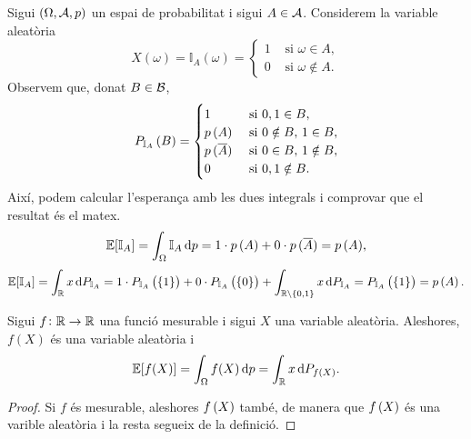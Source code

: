 \begin{example}
    Sigui $\left( \Omega, \mathcal{A}, p\right)$ un espai de probabilitat i sigui $A\in\mathcal{A}$. Considerem la variable aleatòria
    \[
        X(\omega) = \mathbb{I}_A(\omega) = \begin{cases}
        1&\text{ si } \omega\in A, \\ 0&\text{ si } \omega \notin A.
        \end{cases}
    \]
    Observem que, donat $B\in\mathcal{B}$,
    \[
        P_{\mathbb{I}_A}\left( B\right) = \begin{cases}
            1 &\text{ si } 0,1\in B,\\
            p\left( A\right) &\text{ si } 0\notin B,\, 1\in B,\\
            p\,( \overline{A}) &\text{ si } 0\in B,\, 1\notin B,\\
            0 & \text{ si } 0,1\notin B.
        \end{cases}
    \]
    Així, podem calcular l'esperança amb les dues integrals i comprovar que el resultat és el matex.
    \[
        \esp[\mathbb{I}_A] = \int_\Omega{\mathbb{I}_A \dif p} = 1\cdot p\,(A) + 0\cdot p\,(\comp{A}) = p\,(A),
    \]
    \[
        \esp[\mathbb{I}_A] = \int_\real{x\dif P_{\mathbb{I}_A}} = 1\cdot P_{\mathbb{I}_A}\lp\lc 1\rc\rp + 0\cdot P_{\mathbb{I}_A}\lp\lc 0\rc\rp+ \int_{\real\setminus\lc 0,1\rc} x\dif P_{\mathbb{I}_A} = P_{\mathbb{I}_A}\lp\lc 1\rc\rp = p\lp A\rp.
    \]
\end{example}


\begin{prop}
    Sigui $f\colon\mathbb{R}\to\mathbb{R}$ una funció mesurable i sigui $X$ una variable aleatòria. Aleshores, $f(X)$ és una variable aleatòria i
    \[
        \esp[f(X)] = \int_{\Omega}{f(X) \dif p} = \int_\real{x \dif P_{f\lp X\rp}}.
    \]
\end{prop}
\begin{proof}
    Si $f$ és mesurable, aleshores $f\left( X\right)$ també, de manera que $f\left( X\right)$ és una varible aleatòria i la resta segueix de la definició.
\end{proof}

